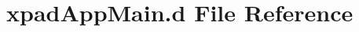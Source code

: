 \hypertarget{xpadAppMain_8d}{\section{xpad\-App\-Main.\-d \-File \-Reference}
\label{xpadAppMain_8d}
}
